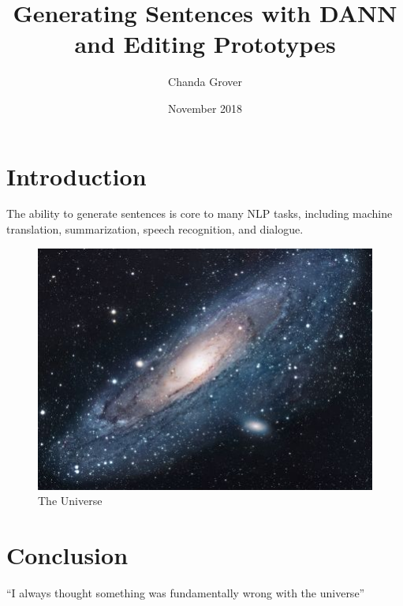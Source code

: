 \documentclass{article}
\title{Generating Sentences with DANN and Editing Prototypes}
\author{Chanda Grover }
\date{November 2018}
\begin{document}
\maketitle

\section{Introduction}
The ability to generate sentences is core to many
NLP tasks, including machine translation, summarization,
speech recognition, and dialogue. 

\begin{figure}[h!]
\centering
\includegraphics[scale=1.7]{universe}
\caption{The Universe}
\label{fig:universe}
\end{figure}



\section{Conclusion}
``I always thought something was fundamentally wrong with the universe'' \citep{adams1995hitchhiker}



\end{document}
